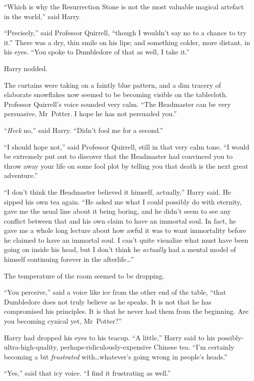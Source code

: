 “Which is why the Resurrection Stone is not the most valuable magical artefact in the world,” said Harry.

“Precisely,” said Professor Quirrell, “though I wouldn’t say no to a chance to try it.” There was a dry, thin smile on his lips; and something colder, more distant, in his eyes. “You spoke to Dumbledore of that as well, I take it.”

Harry nodded.

The curtains were taking on a faintly blue pattern, and a dim tracery of elaborate snowflakes now seemed to be becoming visible on the tablecloth. Professor Quirrell’s voice sounded very calm. “The Headmaster can be very persuasive, Mr~Potter. I hope he has not persuaded you.”

“\emph{Heck} no,” said Harry. “Didn’t fool me for a second.”

“I should hope not,” said Professor Quirrell, still in that very calm tone. “I would be extremely put out to discover that the Headmaster had convinced you to throw away your life on some fool plot by telling you that death is the next great adventure.”

“I don’t think the Headmaster believed it himself, actually,” Harry said. He sipped his own tea again. “He asked me what I could possibly do with eternity, gave me the usual line about it being boring, and he didn’t seem to see any conflict between that and his own claim to have an immortal soul. In fact, he gave me a whole long lecture about how awful it was to want immortality before he claimed to have an immortal soul. I can’t quite visualize what must have been going on inside his head, but I don’t think he \emph{actually} had a mental model of himself continuing forever in the afterlife…”

The temperature of the room seemed to be dropping.

“You perceive,” said a voice like ice from the other end of the table, “that Dumbledore does not truly believe as he speaks. It is not that he has compromised his principles. It is that he never had them from the beginning. Are you becoming cynical yet, Mr~Potter?”

Harry had dropped his eyes to his teacup. “A little,” Harry said to his possibly-ultra-high-quality, perhaps-ridiculously-expensive Chinese tea. “I’m certainly becoming a bit \emph{frustrated} with…whatever’s going wrong in people’s heads.”

“Yes,” said that icy voice. “I find it frustrating as well.”

